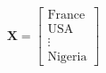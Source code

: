 \documentclass[preview]{standalone}
\begin{document}
\begin{align*}
\mathbf{X} = \begin{bmatrix} \text{France} \\ \text{USA} \\ \vdots \\ \text{Nigeria} \end{bmatrix}
\end{align*}
\end{document}
